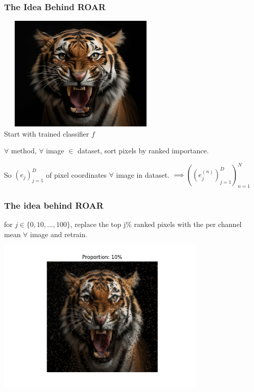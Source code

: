 \documentclass{beamer}
\theoremstyle{mystyle}
\begin{document}
\begin{frame}
	\frametitle{The Idea Behind ROAR}
	\includegraphics[height=5.5cm, width=8cm]{tiger.png}\\
	Start with trained classifier $f$\\ \pause

	$\forall $  method, $\forall $ image $\in$ dataset, sort pixels by ranked importance. \\ \pause 
	

	So $(e_j)_{j=1}^{D}$ of pixel coordinates $\forall $ image in dataset. $\implies ( (e_j^{(n)})_{j=1}^D )_{n=1}^N $
\end{frame}
\begin{frame}
	\frametitle{The idea behind ROAR}

	for $j \in \{0, 10, \ldots,100\} $, replace the top j\% ranked pixels with the per channel mean  $\forall $ image and retrain.
	\includegraphics[height=8cm, width=10cm]{tiger0.1.png}

\end{frame}
\end{document}
